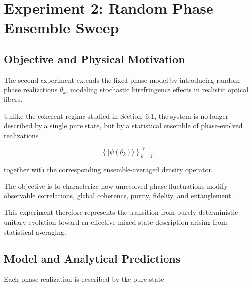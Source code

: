 
\newpage

\section{Experiment 2: Random Phase Ensemble Sweep}
\label{sec:exp_2_random_phase_ensemble_sweep}


\subsection*{Objective and Physical Motivation}

The second experiment extends the fixed-phase model by introducing random phase realizations \( \theta_k \), modeling stochastic birefringence effects in realistic optical fibers.

Unlike the coherent regime studied in Section~6.1, the system is no longer described by a single pure state, but by a statistical ensemble of phase-evolved realizations

\[
\left\{
|\psi(\theta_k)\rangle
\right\}_{k=1}^{N},
\]

together with the corresponding ensemble-averaged density operator.

The objective is to characterize how unresolved phase fluctuations modify observable correlations, global coherence, purity, fidelity, and entanglement.

This experiment therefore represents the transition from purely deterministic unitary evolution toward an effective mixed-state description arising from statistical averaging.


\subsection*{Model and Analytical Predictions}

Each phase realization is described by the pure state

